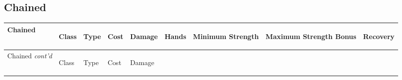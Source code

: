 \documentclass[twoside]{book}
\begin{document}
    

\subsection{Chained}
    
\begin{longtable}{p{1.25in}llllp{2em}p{3em}p{3em}l} 
  Chained
  &
  \begin{turn}{70}{Class}\end{turn}
          
  &
  \begin{turn}{70}{Type}\end{turn}
          
  &
  \begin{turn}{70}{Cost}\end{turn}
          
  &
  \begin{turn}{70}{Damage}\end{turn}
          
  &
  \begin{turn}{70}{Hands}\end{turn}
          
  &
  \begin{turn}{70}{Minimum Strength}\end{turn}
          
  &
  \begin{turn}{70}{Maximum Strength Bonus}\end{turn}
          
  &
  \begin{turn}{70}{Recovery}\end{turn}
          
  \\
  \hline
  \hline
  \endfirsthead
  Chained \textit{cont'd}
        
  &
  \begin{turn}{70}{Class}\end{turn}
          
  &
  \begin{turn}{70}{Type}\end{turn}
          
  &
  \begin{turn}{70}{Cost}\end{turn}
          
  &
  \begin{turn}{70}{Damage}\end{turn}
          

\end{longtable}
\end{document}

